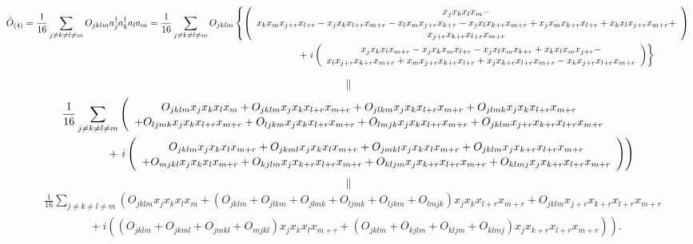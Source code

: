 \documentclass[aps,preprint]{revtex4}%
\begin{document}
\begin{align}
\hat{O}_{\left(  4\right)  }=\frac{1}{16}\sum_{j\neq k\neq l\neq m}O_{jklm}
&  a_{j}^{\dagger}a_{k}^{\dagger}a_{l}a_{m}=\frac{1}{16}\sum_{j\neq k\neq
l\neq m}O_{jklm}\left\{  \left(
\begin{array}
[c]{c}%
x_{j}x_{k}x_{l}x_{m}-\\
x_{k}x_{m}x_{j+r}x_{l+r}-x_{j}x_{k}x_{l+r}x_{m+r}-x_{l}x_{m}x_{j+r}%
x_{k+r}-x_{j}x_{l}x_{k+r}x_{m+r}+x_{j}x_{m}x_{k+r}x_{l+r}+x_{k}x_{l}%
x_{j+r}x_{m+r}+\\
x_{j+r}x_{k+r}x_{l+r}x_{m+r}%
\end{array}
\right)  \right. \\
&  \qquad\qquad\qquad\qquad\qquad\qquad\qquad\qquad\qquad\qquad+\left.
i\left(
\begin{array}
[c]{c}%
x_{j}x_{k}x_{l}x_{m+r}-x_{j}x_{k}x_{m}x_{l+r}-x_{j}x_{l}x_{m}x_{k+r}%
+x_{k}x_{l}x_{m}x_{j+r}-\\
x_{l}x_{j+r}x_{k+r}x_{m+r}+x_{m}x_{j+r}x_{k+r}x_{l+r}+x_{j}x_{k+r}%
x_{l+r}x_{m+r}-x_{k}x_{j+r}x_{l+r}x_{m+r}%
\end{array}
\right)  \right\}
\end{align}
%

\begin{equation}
\parallel
\end{equation}%
\begin{align}
&  \frac{1}{16}\sum_{j\neq k\neq l\neq m}\left(
\begin{array}
[c]{c}%
O_{jklm}\overset{}{x_{j}x_{k}x_{l}x_{m}+O_{jklm}x_{j}x_{k}x_{l+r}%
x_{m+r}+O_{jlkm}x_{j}x_{k}x_{l+r}x_{m+r}+O_{jlmk}x_{j}x_{k}x_{l+r}x_{m+r}}\\
+\overset{}{O_{ljmk}x_{j}x_{k}x_{l+r}x_{m+r}+O_{ljkm}x_{j}x_{k}x_{l+r}%
x_{m+r}+O_{lmjk}x_{j}x_{k}x_{l+r}x_{m+r}+O_{jklm}x_{j+r}x_{k+r}x_{l+r}x_{m+r}}%
\end{array}
\right. \\
&  \qquad\quad\quad+\left.  i\left(
\begin{array}
[c]{c}%
O_{jklm}\overset{}{x_{j}x_{k}x_{l}x_{m+r}+O_{jkml}x_{j}x_{k}x_{l}%
x_{m+r}+O_{jmkl}x_{j}x_{k}x_{l}x_{m+r}+O_{jklm}x_{j}x_{k+r}x_{l+r}x_{m+r}}\\
+\overset{}{O_{mjkl}x_{j}x_{k}x_{l}x_{m+r}+O_{kjlm}x_{j}x_{k+r}x_{l+r}%
x_{m+r}+O_{kljm}x_{j}x_{k+r}x_{l+r}x_{m+r}+O_{klmj}x_{j}x_{k+r}x_{l+r}x_{m+r}}%
\end{array}
\right)  \right)
\end{align}%
\begin{equation}
\parallel
\end{equation}%
\begin{align}
&  \frac{1}{16}\sum_{j\neq k\neq l\neq m}\left(  O_{jklm}x_{j}x_{k}x_{l}%
x_{m}+\left(  \overset{}{O_{jklm}+O_{jlkm}+O_{jlmk}+O_{ljmk}+O_{ljkm}%
+O_{lmjk}}\right)  x_{j}x_{k}x_{l+r}x_{m+r}+O_{jklm}x_{j+r}x_{k+r}%
x_{l+r}x_{m+r}\right. \\
&  \qquad\quad\quad+\left.  i\left(  \overset{}{\left(  O_{jklm}%
+O_{jkml}+O_{jmkl}+O_{mjkl}\right)  x_{j}x_{k}x_{l}x_{m+r}+\left(
O_{jklm}+O_{kjlm}+O_{kljm}+O_{klmj}\right)  x_{j}x_{k+r}x_{l+r}x_{m+r}%
}\right)  \right)  .
\end{align}
\end{document}
